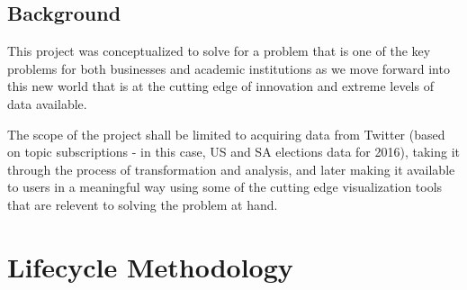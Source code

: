 \documentclass[12pt]{article} %
\begin{document}






	
		
		
	\subsection{Background}
	This project was conceptualized to solve for a problem that is one of the key problems for both businesses and academic institutions as we move forward into this new world that is at the cutting edge of innovation and extreme levels of data available.
	
	The scope of the project shall be limited to acquiring data from Twitter (based on topic subscriptions - in this case, US and SA elections data for 2016), taking it through the process of transformation and analysis, and later making it available to users in a meaningful way using some of the cutting edge visualization tools that are relevent to solving the problem at hand.

	\section{Lifecycle Methodology}
	
\end{document}
